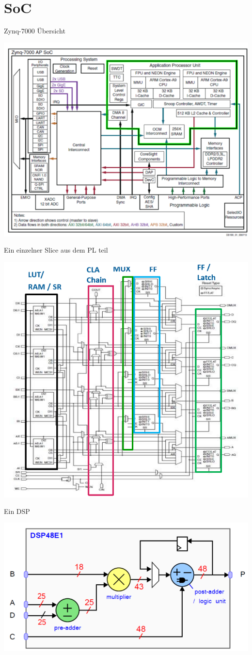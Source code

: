 \section{SoC}
Zynq-7000 Übersicht
\begin{center}
	\includegraphics[width=\columnwidth]{Images/soc}
\end{center}

Ein einzelner Slice aus dem PL teil
\begin{center}
	\includegraphics[width=\columnwidth]{Images/slice}
\end{center}

Ein DSP
\begin{center}
	\includegraphics[width=\columnwidth]{Images/dsp}
\end{center}
